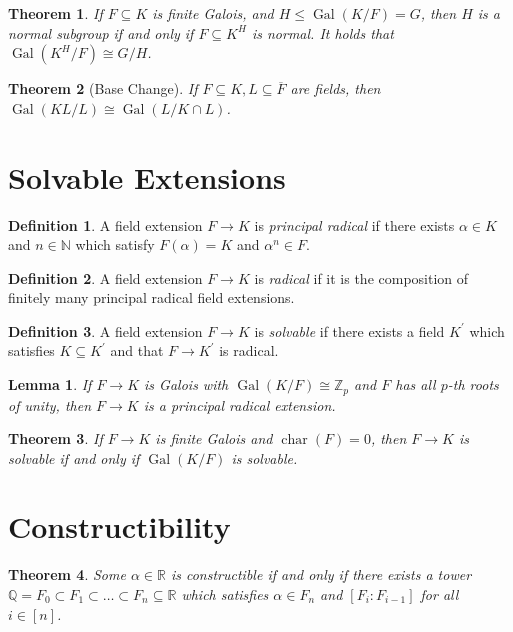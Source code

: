 \documentclass[
    parskip=half,
    toc=flat,
    toc=sectionentrydotfill,
]{scrartcl}  %
\theoremstyle{definition}
\newtheorem{definition}{Definition}[section]
\theoremstyle{plain}
\newtheorem{theorem}{Theorem}[section]
\newtheorem{lemma}{Lemma}[section]
\theoremstyle{remark}
\DeclareMathOperator{\Char}{char}
\DeclareMathOperator{\Gal}{Gal}
\newcommand{\N}{\mathbb{N}}
\newcommand{\Q}{\mathbb{Q}}
\newcommand{\R}{\mathbb{R}}
\newcommand{\Z}{\mathbb{Z}}
\begin{document}
\begin{theorem}
    If $F\subseteq K$ is finite Galois, and $H\leq\Gal(K/F)=G$, then $H$ is a normal subgroup if and only if
    $F\subseteq K^H$ is normal.
    It holds that $\Gal(K^H/F)\cong G/H$.
\end{theorem}

\begin{theorem}[Base Change]
    If $F\subseteq K,L\subseteq\overline{F}$ are fields, then $\Gal(KL/L)\cong\Gal(L/K\cap L)$.
\end{theorem}


\section{Solvable Extensions}

\begin{definition}
    A field extension $F\to K$ is \textit{principal radical} if there exists $\alpha\in K$ and $n\in\N$ which satisfy
    $F(\alpha)=K$ and $\alpha^n\in F$.
\end{definition}

\begin{definition}
    A field extension $F\to K$ is \textit{radical} if it is the composition of finitely many principal radical field
    extensions.
\end{definition}

\begin{definition}
    A field extension $F\to K$ is \textit{solvable} if there exists a field $K^\prime$ which satisfies
    $K\subseteq K^\prime$ and that $F\to K^\prime$ is radical.
\end{definition}

\begin{lemma}
    If $F\to K$ is Galois with $\Gal(K/F)\cong\Z_p$ and $F$ has all $p$-th roots of unity, then $F\to K$ is a principal
    radical extension.
\end{lemma}

\begin{theorem}
    If $F\to K$ is finite Galois and $\Char(F)=0$, then $F\to K$ is solvable if and only if $\Gal(K/F)$ is solvable.
\end{theorem}


\section{Constructibility}

\begin{theorem}
    Some $\alpha\in\R$ is constructible if and only if there exists a tower
    $\Q=F_0\subset F_1\subset\dots\subset F_n\subseteq\mathbb{R}$ which satisfies $\alpha\in F_n$ and $[F_i:F_{i-1}]$
    for all $i\in[n]$.
\end{theorem}
\end{document}
